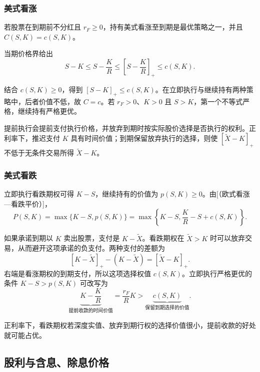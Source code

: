 \subsubsection{美式看涨}
\begin{tcolorbox}[knowledge,title=无股利、非负利率下的美式看涨]
若股票在到期前不分红且 $r_F\ge0$，持有美式看涨至到期是最优策略之一，并且 $C(S,K)=c(S,K)$。
\end{tcolorbox}
\begin{solution}[label-content={证明},blank-type=none]
当期价格界给出
\[
 S-K\le S-\frac K R\le\left[S-\frac K R\right]_+\le c(S,K).
\]

结合 $c(S,K)\ge0$，得到 $[S-K]_+\le c(S,K)$。在立即执行与继续持有两种策略中，后者价值不低，故 $C=c$。若 $r_F>0$、$K>0$ 且 $S>K$，第一个不等式严格，继续持有严格更优。
\end{solution}

提前执行会提前支付执行价格，并放弃到期时按实际股价选择是否执行的权利。正利率下，推迟支付 $K$ 具有时间价值；到期保留放弃执行的选择，则使 $[\tilde X-K]_+$ 不低于无条件交易所得 $\tilde X-K$。

\subsubsection{美式看跌}
立即执行看跌期权可得 $K-S$，继续持有的价值为 $p(S,K)\ge0$。由[（欧式看涨—看跌平价）]，
\[
 P(S,K)=\max\{K-S,p(S,K)\}
 =\max\left\{K-S,\frac K R-S+c(S,K)\right\}.
\]

如果承诺到期以 $K$ 卖出股票，支付是 $K-\tilde X$。看跌期权在 $\tilde X>K$ 时可以放弃交易，从而避开这项承诺的负支付。两种支付的差额为
\[
 [K-\tilde X]_+-(K-\tilde X)=[\tilde X-K]_+.
\]
右端是看涨期权的到期支付，所以这项选择权值 $c(S,K)$。立即执行严格更优的条件 $K-S>p(S,K)$ 可改写为
\[
 \underbrace{K-\frac K R}_{\text{提前收款的时间价值}}
 =\frac{r_F}{R}K
 >\underbrace{c(S,K)}_{\text{保留到期选择的价值}}.
\]

正利率下，看跌期权若深度实值、放弃到期行权的选择价值很小，提前收款的好处就可能占优。

\subsection{股利与含息、除息价格}
